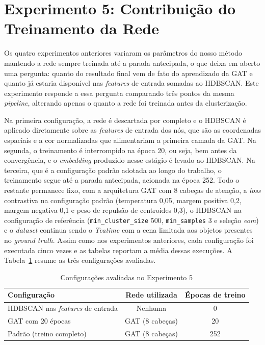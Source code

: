 \FloatBarrier
\section{Experimento 5: Contribuição do Treinamento da Rede}

Os quatro experimentos anteriores variaram os parâmetros do nosso método mantendo a rede sempre treinada até a parada antecipada, o que deixa em aberto uma pergunta: quanto do resultado final vem de fato do aprendizado da GAT e quanto já estaria disponível nas \textit{features} de entrada somadas ao HDBSCAN. Este experimento responde a essa pergunta comparando três pontos da mesma \textit{pipeline}, alterando apenas o quanto a rede foi treinada antes da clusterização.

Na primeira configuração, a rede é descartada por completo e o HDBSCAN é aplicado diretamente sobre as \textit{features} de entrada dos nós, que são as coordenadas espaciais e a cor normalizadas que alimentariam a primeira camada da GAT. Na segunda, o treinamento é interrompido na época 20, ou seja, bem antes da convergência, e o \textit{embedding} produzido nesse estágio é levado ao HDBSCAN. Na terceira, que é a configuração padrão adotada ao longo do trabalho, o treinamento segue até a parada antecipada, acionada na época 252. Todo o restante permanece fixo, com a arquitetura GAT com 8 cabeças de atenção, a \textit{loss} contrastiva na configuração padrão (temperatura 0,05, margem positiva 0,2, margem negativa 0,1 e peso de repulsão de centroides 0,3), o HDBSCAN na configuração de referência (\texttt{min\_cluster\_size} 500, \texttt{min\_samples} 3 e seleção \textit{eom}) e o \textit{dataset} continua sendo o \textit{Teatime} com a cena limitada aos objetos presentes no \textit{ground truth}. Assim como nos experimentos anteriores, cada configuração foi executada cinco vezes e as tabelas reportam a média dessas execuções. A Tabela~\ref{tab:config_experimento5} resume as três configurações avaliadas.
\begin{table}[h]
\centering
\caption{Configurações avaliadas no Experimento 5}
\label{tab:config_experimento5}
\begin{tabular}{lcc}
\hline
\textbf{Configuração} & \textbf{Rede utilizada} & \textbf{Épocas de treino} \\
\hline
HDBSCAN nas \textit{features} de entrada & Nenhuma & 0 \\
GAT com 20 épocas & GAT (8 cabeças) & 20 \\
Padrão (treino completo) & GAT (8 cabeças) & 252 \\
\hline
\end{tabular}
\end{table}


